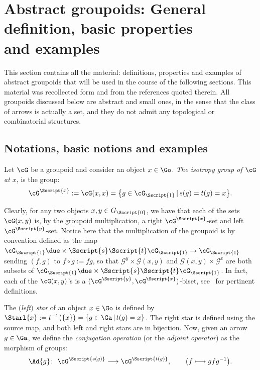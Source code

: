 \section[Abstract groupoids: General definition, basic properties and examples]{Abstract groupoids: General definition, basic properties\\ and examples}\label{sec:Grpd}
This section contains all the material: definitions, properties and examples of abstract groupoids that will be used in the course of the following sections. This material was recollected form \cite{ElKaoutit:2015, Kaoutit/Kowalzig:14, Kaoutit/Spinosa:2018} and from the references quoted therein. All groupoids discussed below are abstract and small ones, in the sense that the class of arrows is actually a set, and they do not admit any topological or combinatorial structures.

\subsection{Notations, basic notions and examples}\label{ssec:basic}Let $\cG$ be a groupoid and consider an object $x \in \Go$. \emph{The isotropy group of $\cG$ at $x$}, is the group:
\begin{gather}\label{Eq:isotropy}
\cG^{\Sscript{x}}:=\cG(x,x) = \big\{ g \in \cG_{\Sscript{1}}\,|\, s(g)=t(g)=x \big\}.
\end{gather}

Clearly, for any two objects $x, y \in G_{\Sscript{0}}$, we have that each of the sets $\cG(x,y)$ is, by the groupoid multiplication, a right $\cG^{\Sscript{x}}$-set and left $\cG^{\Sscript{y}}$-set. Notice here that the multiplication of the groupoid is by convention defined as the map $\cG_{\Sscript{1}} \due \times {\Sscript{{s}}} { \Sscript{{t}}} \cG_{\Sscript{1}} \to \cG_{\Sscript{1}}$ sending $(f,g)$ to $f \circ g:=fg$, so that $\mathcal{G}^{y} \times \mathcal{G}(x,y)$ and $\mathcal{G}(x,y) \times \mathcal{G}^{x} $ are both subsets of $\cG_{\Sscript{1}} \due \times {\Sscript{{s}}} { \Sscript{{t}}} \cG_{\Sscript{1}} $. In fact, each of the $\cG(x,y)$'s is a $(\cG^{\Sscript{y}}, \cG^{\Sscript{x}})$-biset, see~\cite{Bouc:2010} for pertinent definitions.

The \emph{$($left$)$ star} of an object $x \in \Go$ is defined by $\Starl{x}:=t^{-1}\big( \{ x\}\big)=\{ g \in \Ga \,|\, t(g)=x \}$. The right star is defined using the source map, and both left and right stars are in bijection. Now, given an arrow $g \in \Ga$, we define the \emph{conjugation operation} (or the \emph{adjoint operator}) as the morphism of groups:
\begin{gather}\label{Eq:Ad}
\Ad{g}\colon \ \cG^{\Sscript{s(g)}} \longrightarrow \cG^{\Sscript{t(g)}}, \qquad \big( f \longmapsto gfg^{-1} \big).
\end{gather}

